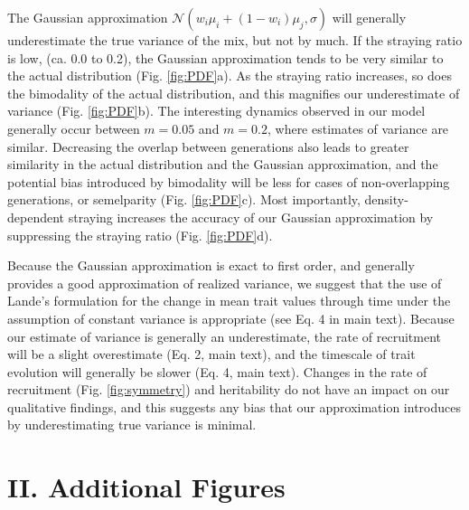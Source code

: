 \documentclass{revtex4}
\begin{document}
The Gaussian approximation $\mathcal{N}(w_i\mu_i + (1-w_i)\mu_j,\sigma)$ will generally underestimate the true variance of the mix, but not by much.
If the straying ratio is low, (ca. 0.0 to 0.2), the Gaussian approximation tends to be very similar to the actual distribution (Fig. \ref{fig:PDF}a).
As the straying ratio increases, so does the bimodality of the actual distribution, and this magnifies our underestimate of variance (Fig. \ref{fig:PDF}b).
The interesting dynamics observed in our model generally occur between $m=0.05$ and $m=0.2$, where estimates of variance are similar.
Decreasing the overlap between generations also leads to greater similarity in the actual distribution and the Gaussian approximation, and the potential bias introduced by bimodality will be less for cases of non-overlapping generations, or semelparity (Fig. \ref{fig:PDF}c).
Most importantly, density-dependent straying increases the accuracy of our Gaussian approximation by suppressing the straying ratio (Fig. \ref{fig:PDF}d).

Because the Gaussian approximation is exact to first order, and generally provides a good approximation of realized variance, we suggest that the use of Lande's formulation for the change in mean trait values through time under the assumption of constant variance is appropriate (see Eq. 4 in main text).
Because our estimate of variance is generally an underestimate, the rate of recruitment will be a slight overestimate (Eq. 2, main text), and the timescale of trait evolution will generally be slower (Eq. 4, main text).
Changes in the rate of recruitment (Fig. \ref{fig:symmetry}) and heritability do not have an impact on our qualitative findings, and this suggests any bias that our approximation introduces by underestimating true variance is minimal.




\section*{II. Additional Figures}


% 
\end{document}
